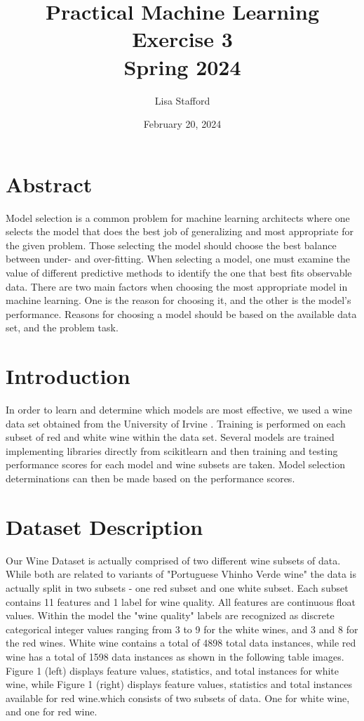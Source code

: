 \documentclass[titlepage]{article}
\title{%
	Practical Machine Learning\\
	
	\vspace*{2em}
	\LARGE Exercise 3 \\
	Spring 2024}
\author{Lisa Stafford}
\date{February 20, 2024}
\begin{document}
	\setlength\parindent{0pt}
	
	\maketitle
	
	\section*{Abstract}
	Model selection is a common problem for machine learning architects where one selects the model that does the best job of generalizing and most appropriate for the given problem.  Those selecting the model should choose the best balance between under- and over-fitting.  When selecting a model, one must examine the value of different predictive methods to identify the one that best fits observable data.  There are two main factors when choosing the most appropriate model in machine learning.  One is the reason for choosing it, and the other is the model's performance.  Reasons for choosing a model should be based on the available data set, and the problem task.
	
	\section*{Introduction}
	In order to learn and determine which models are most effective, we used a wine data set obtained from the University of Irvine \cite{dataset}. Training is performed on each subset of red and white wine within the data set.  Several models are trained implementing libraries directly from scikitlearn \cite{scikitlearn} and then training and testing performance scores for each model and wine subsets are taken.  Model selection determinations can then be made based on the performance scores.  
	
	\section*{Dataset Description}
	Our Wine Dataset is actually comprised of two different wine subsets of data.  While both are related to variants of \cite{dataset2} "Portuguese Vhinho Verde wine" the data is actually split in two subsets - one red subset and one white subset.  Each subset contains 11 features and 1 label for wine quality.   All features are continuous float values.  Within the model the "wine quality" labels are recognized as discrete categorical integer values ranging from 3 to 9 for the white wines, and 3 and 8 for the red wines.  White wine contains a total of 4898 total data instances, while red wine has a total of 1598 data instances as shown in the following table images. Figure 1 (left) displays feature values, statistics, and total instances for white wine, while Figure 1 (right) displays feature values, statistics and total instances available for red wine.which consists of two subsets of data.  One for white wine, and one for red wine. 
	
\end{document}
